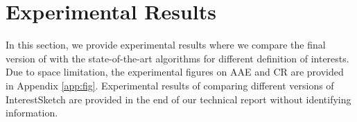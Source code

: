 

\presec
\section{Experimental Results} \postsec
\label{sec:experiments}

In this section, we provide experimental results where we compare the final version of \sketchname{} with the state-of-the-art algorithms for different definition of interests. Due to space limitation, the experimental figures on AAE and CR are provided in Appendix \ref{app:fig}. Experimental results of comparing different versions of InterestSketch are provided in the end of our technical report \cite{opensource} without identifying information.

			










